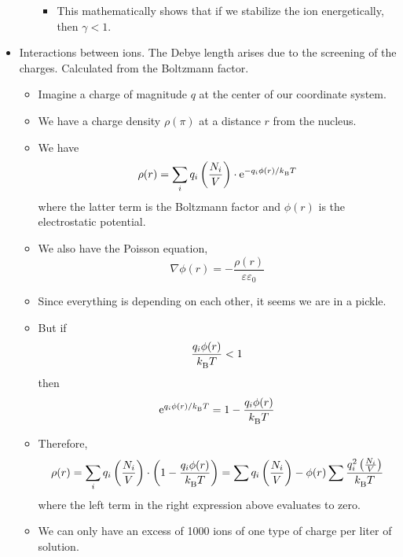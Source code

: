 \documentclass[../notes.tex]{subfiles}
\begin{document}
\begin{itemize}
\begin{itemize}
        \begin{itemize}
            \item This mathematically shows that if we stabilize the ion energetically, then $\gamma<1$.
        \end{itemize}
    \end{itemize}
    \item Interactions between ions. The Debye length arises due to the screening of the charges. Calculated from the Boltzmann factor.
    \begin{itemize}
        \item Imagine a charge of magnitude $q$ at the center of our coordinate system.
        \item We have a charge density $\rho(\pi)$ at a distance $r$ from the nucleus.
        \item We have
        \begin{equation*}
            \rho(r) = \sum_iq_i\left( \frac{N_i}{V} \right)\cdot\e[-q_i\phi(r)/\kB T]
        \end{equation*}
        where the latter term is the Boltzmann factor and $\phi(r)$ is the electrostatic potential.
        \item We also have the Poisson equation,
        \begin{equation*}
            \nabla\phi(r) = -\frac{\rho(r)}{\varepsilon\varepsilon_0}
        \end{equation*}
        \item Since everything is depending on each other, it seems we are in a pickle.
        \item But if
        \begin{equation*}
            \frac{q_i\phi(r)}{\kB T} < 1
        \end{equation*}
        then
        \begin{equation*}
            \e[q_i\phi(r)/\kB T] = 1-\frac{q_i\phi(r)}{\kB T}
        \end{equation*}
        \item Therefore,
        \begin{equation*}
            \rho(r) = \sum_iq_i\left( \frac{N_i}{V} \right)\cdot\left( 1-\frac{q_i\phi(r)}{\kB T} \right)
            = \sum q_i\left( \frac{N_i}{V} \right)-\phi(r)\sum\frac{q_i^2\left( \frac{N_i}{V} \right)}{\kB T}
        \end{equation*}
        where the left term in the right expression above evaluates to zero.
        \item We can only have an excess of 1000 ions of one type of charge per liter of solution.

\end{itemize}
\end{itemize}
\end{document}

